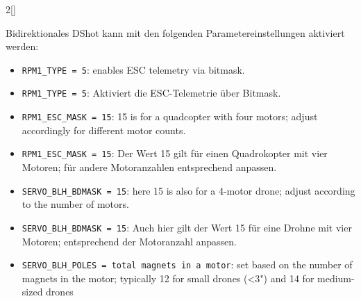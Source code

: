 \begin{paracol}{2}[]
\colger

Bidirektionales DShot kann mit den folgenden Parametereinstellungen aktiviert werden:

\coleng

\begin{itemize}
\item \texttt{RPM1\_TYPE = 5}: enables ESC telemetry via bitmask.
\end{itemize}

\colger

\begin{itemize}
\item \texttt{RPM1\_TYPE = 5}: Aktiviert die ESC-Telemetrie über Bitmask.
\end{itemize}

\coleng

\begin{itemize}
\item \texttt{RPM1\_ESC\_MASK = 15}: 15 is for a quadcopter with four motors; adjust accordingly for different motor counts.
\end{itemize}

\colger

\begin{itemize}
\item \texttt{RPM1\_ESC\_MASK = 15}: Der Wert 15 gilt für einen Quadrokopter mit vier Motoren; für andere Motoranzahlen entsprechend anpassen.
\end{itemize}

\coleng

\begin{itemize}
\item \texttt{SERVO\_BLH\_BDMASK = 15}: here 15 is also for a 4-motor drone; adjust according to the number of motors.
\end{itemize}

\colger

\begin{itemize}
\item \texttt{SERVO\_BLH\_BDMASK = 15}: Auch hier gilt der Wert 15 für eine Drohne mit vier Motoren; entsprechend der Motoranzahl anpassen.
\end{itemize}

\coleng

\begin{itemize}
\item \texttt{SERVO\_BLH\_POLES = total magnets in a motor}: set based on the number of magnets in the motor; typically 12 for small drones (<3") and 14 for medium-sized drones
\end{itemize}


\end{paracol}
